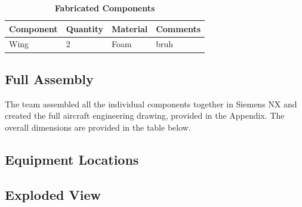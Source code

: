     
    
 \begin{table}[H]
     \begin{center}
     \caption{\textbf{Fabricated Components}} \label{table:fab_components}
     \begin{tabular}{|p{2in}|p{1in}|p{1in}|p{1in}|} %
         \hline \textbf{Component} & \textbf{Quantity} & \textbf{Material} & \textbf{Comments} \\ \hline %
         Wing & 2 & Foam & bruh \\ \hline
     \end{tabular}
     \end{center}
 \end{table}
    
    \subsection{Full Assembly}
    
    The team assembled all the individual components together in Siemens NX and created the full aircraft engineering drawing, provided in the Appendix. The overall dimensions are provided in the table below.
    
    
    
    
    \subsection{Equipment Locations}
    
    \subsection{Exploded View}
    
